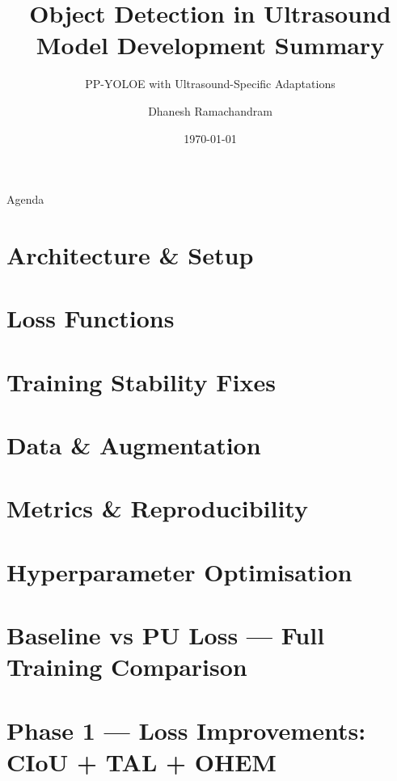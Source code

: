 \documentclass[aspectratio=169, 10pt]{beamer}
\title[Ultrasound Object Detection]{Object Detection in Ultrasound\\{\large Model Development Summary}}
\subtitle{PP-YOLOE with Ultrasound-Specific Adaptations}
\author{Dhanesh Ramachandram}
\date{\today}
\begin{document}
\begin{frame}
  \titlepage
\end{frame}

\begin{frame}{Agenda}
  \tableofcontents
\end{frame}

\section{Architecture \& Setup}
\section{Loss Functions}
\section{Training Stability Fixes}
\section{Data \& Augmentation}
\section{Metrics \& Reproducibility}
\section{Hyperparameter Optimisation}
\section{Baseline vs PU Loss — Full Training Comparison}
\section{Phase 1 — Loss Improvements: CIoU + TAL + OHEM}
\end{document}
